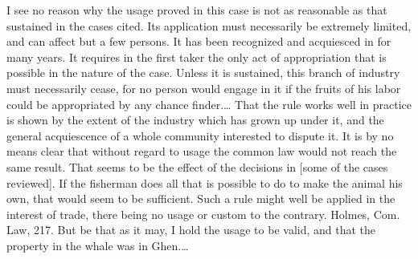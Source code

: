 I see no reason why the usage proved in this case is not as reasonable as that
sustained in the cases cited. Its application must necessarily be extremely
limited, and can affect but a few persons. It has been recognized and acquiesced
in for many years. It requires in the first taker the only act of appropriation
that is possible in the nature of the case. Unless it is sustained, this branch
of industry must necessarily cease, for no person would engage in it if the
fruits of his labor could be appropriated by any chance finder.\ldots
That the rule works
well in practice is shown by the extent of the industry which has grown up under
it, and the general acquiescence of a whole community interested to dispute it.
It is by no means clear that without regard to usage the common law would not
reach the same result. That seems to be the effect of the decisions in
[some of the cases reviewed].
If the fisherman does all that is possible to do to
make the animal his own, that would seem to be sufficient. Such a rule might
well be applied in the interest of trade, there being no usage or custom to the
contrary. Holmes, Com. Law, 217. But be that as it may, I hold the usage to be
valid, and that the property in the whale was in Ghen.\ldots



